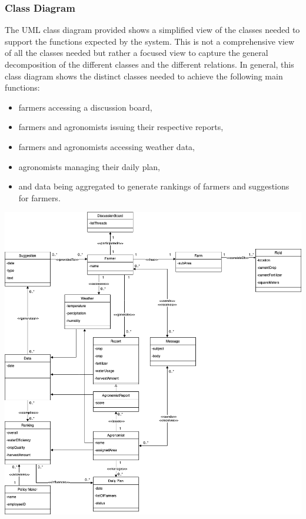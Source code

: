\subsubsection{Class Diagram}
The UML class diagram provided shows a simplified view of the classes needed to support the functions expected by the system. This is not a comprehensive view of all the classes needed but rather a focused view to capture the general decomposition of the different classes and the different relations. In general, this class diagram shows the distinct classes needed to achieve the following main functions:
\begin{itemize}
\item farmers accessing a discussion board,
\item farmers and agronomists issuing their respective reports,
\item farmers and agronomists accessing weather data,
\item agronomists managing their daily plan,
\item and data being aggregated to generate rankings of farmers and suggestions for farmers. 
\end{itemize} 
\smallskip

\begin{center}
\includegraphics[scale=0.4]{../images_diagrams/class_diagram.drawio.png}
\end{center}

